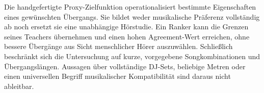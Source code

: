 Die handgefertigte Proxy-Zielfunktion operationalisiert bestimmte Eigenschaften eines gewünschten Übergangs. Sie bildet weder musikalische Präferenz vollständig ab noch ersetzt sie eine unabhängige Hörstudie. Ein Ranker kann die Grenzen seines Teachers übernehmen und einen hohen Agreement-Wert erreichen, ohne bessere Übergänge aus Sicht menschlicher Hörer auszuwählen. Schließlich beschränkt sich die Untersuchung auf kurze, vorgegebene Songkombinationen und Übergangslängen. Aussagen über vollständige DJ-Sets, beliebige Metren oder einen universellen Begriff musikalischer Kompatibilität sind daraus nicht ableitbar.
